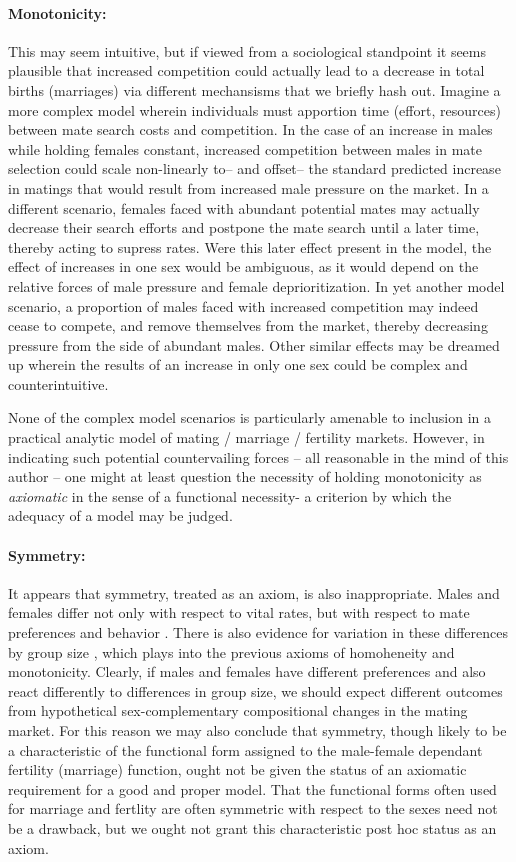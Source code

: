 \paragraph{Monotonicity:} This may seem intuitive, but if viewed from a
sociological standpoint it seems plausible that increased competition could actually lead to a
decrease in total births (marriages) via different mechansisms that we
briefly hash out. Imagine a more complex model wherein individuals must
apportion time (effort, resources) between mate search costs and competition. 
In the case of an increase in males while holding females
constant, increased competition between males in mate selection could
 scale non-linearly to-- and offset-- the standard predicted increase in matings
 that would result from increased male pressure on the market. In a different
 scenario, females faced with abundant potential mates may actually decrease their 
 search efforts and postpone the mate search until a later time,
 thereby acting to supress rates. Were this later effect present in the model,
 the effect of increases in one sex would be ambiguous, as it would depend on
 the relative forces of male pressure and female deprioritization. In yet
 another model scenario, a proportion of males faced with increased competition may 
 indeed cease to compete, and remove themselves from the market, thereby 
 decreasing pressure from the side of abundant males. Other similar effects may
 be dreamed up wherein the results of an increase in only one sex could be
 complex and counterintuitive. 
 
 None of the complex model scenarios is particularly amenable to inclusion in
 a practical analytic model of mating / marriage / fertility markets. However,
 in indicating such potential countervailing forces -- all reasonable in the
 mind of this author -- one might at least question the necessity of holding
 monotonicity as \textit{axiomatic} in the sense of a functional necessity- a
 criterion by which the adequacy of a model may be judged. 

\paragraph{Symmetry:} It appears that symmetry, treated as an axiom, is also
inappropriate. Males and females differ not only with respect to vital rates,
but with respect to mate preferences and behavior \citep{buss1989sex}. There is
also evidence for variation in these differences by group size
\citep{fisman2006gender}, which plays into the previous axioms of
homoheneity and monotonicity. Clearly, if males and females have different
preferences and also react differently to differences in group size, we should expect different outcomes
from hypothetical sex-complementary compositional changes in the mating market.
For this reason we may also conclude that symmetry, though likely to be a
characteristic of the functional form assigned to the male-female
dependant fertility (marriage) function, ought not be given the status of an
axiomatic requirement for a good and proper model. That the functional forms
often used for marriage and fertlity are often symmetric with respect to the
sexes need not be a drawback, but we ought not grant this characteristic post
hoc status as an axiom.

